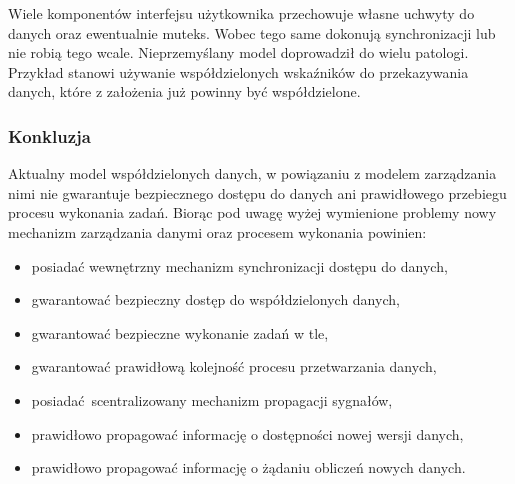 Wiele komponentów interfejsu użytkownika przechowuje własne uchwyty do danych oraz ewentualnie muteks. Wobec tego same dokonują synchronizacji lub nie robią tego wcale. Nieprzemyślany model doprowadził do wielu patologi. Przykład stanowi używanie współdzielonych wskaźników do przekazywania danych, które z założenia już powinny być współdzielone.

\subsubsection{Konkluzja}

Aktualny model współdzielonych danych, w powiązaniu z modelem zarządzania nimi nie gwarantuje bezpiecznego dostępu do danych ani prawidłowego przebiegu procesu wykonania zadań. Biorąc pod uwagę wyżej wymienione problemy nowy mechanizm zarządzania danymi oraz procesem wykonania powinien: 
\begin{itemize}
	\item posiadać wewnętrzny mechanizm synchronizacji dostępu do danych,
	\item gwarantować bezpieczny dostęp do współdzielonych danych,
	\item gwarantować bezpieczne wykonanie zadań w tle,
	\item gwarantować prawidłową kolejność procesu przetwarzania danych,
	\item posiadać scentralizowany mechanizm propagacji sygnałów,
	\item prawidłowo propagować informację o dostępności nowej wersji danych,
	\item prawidłowo propagować informację o żądaniu obliczeń nowych danych.
\end{itemize}





